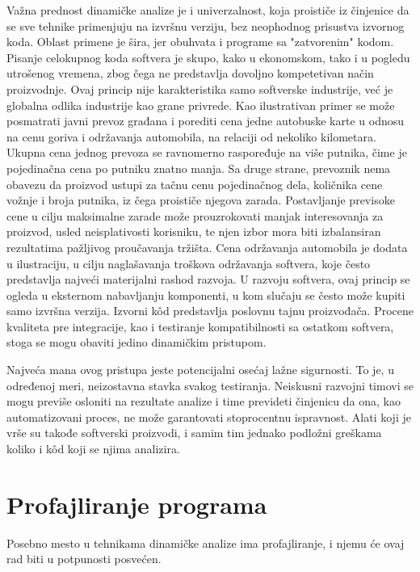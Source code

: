 \documentclass[12pt,oneside]{memoir}
\begin{document}
 
Važna prednost dinamičke analize je i univerzalnost, koja proističe iz činjenice da se sve tehnike primenjuju na izvršnu verziju, bez neophodnog prisustva izvornog koda. Oblast primene je šira, jer obuhvata i programe sa "zatvorenim" kodom. Pisanje celokupnog koda softvera je skupo, kako u ekonomskom, tako i u pogledu utrošenog vremena, zbog čega ne predstavlja dovoljno kompetetivan način proizvodnje. Ovaj princip nije karakteristika samo softverske industrije, već je globalna odlika industrije kao grane privrede. Kao ilustrativan primer se može posmatrati javni prevoz građana i porediti cena jedne autobuske karte u odnosu na cenu goriva i održavanja automobila, na relaciji od nekoliko kilometara. Ukupna cena jednog prevoza se ravnomerno raspoređuje na više putnika, čime je pojedinačna cena po putniku znatno manja. Sa druge strane, prevoznik nema obavezu da proizvod ustupi za tačnu cenu pojedinačnog dela, količnika cene vožnje i broja putnika, iz čega proističe njegova zarada. Postavljanje previsoke cene u cilju maksimalne zarade može prouzrokovati manjak interesovanja za proizvod, usled neisplativosti korisniku, te njen izbor mora biti izbalansiran rezultatima pažljivog proučavanja tržišta. Cena održavanja automobila je dodata u ilustraciju, u cilju naglašavanja troškova održavanja softvera, koje često predstavlja najveći materijalni rashod razvoja. U razvoju softvera, ovaj princip se ogleda u eksternom nabavljanju komponenti, u kom slučaju se često može kupiti samo izvršna verzija. Izvorni k\^{o}d predstavlja poslovnu tajnu proizvođača. Procene kvaliteta pre integracije, kao i testiranje kompatibilnosti sa ostatkom softvera, stoga se mogu obaviti jedino dinamičkim pristupom. 

Najveća mana ovog pristupa jeste potencijalni osećaj lažne sigurnosti. To je, u određenoj meri, neizostavna stavka svakog testiranja. Neiskusni razvojni timovi se mogu previše osloniti na rezultate analize i time prevideti činjenicu da ona, kao automatizovani proces, ne može garantovati stoprocentnu ispravnost. Alati koji je vrše su takođe softverski proizvodi, i samim tim jednako podložni greškama koliko i k\^{o}d koji se njima analizira. 

\section{Profajliranje programa}

Posebno mesto u tehnikama dinamičke analize ima profajliranje, i njemu će ovaj rad biti u potpunosti posvećen.
\end{document}
